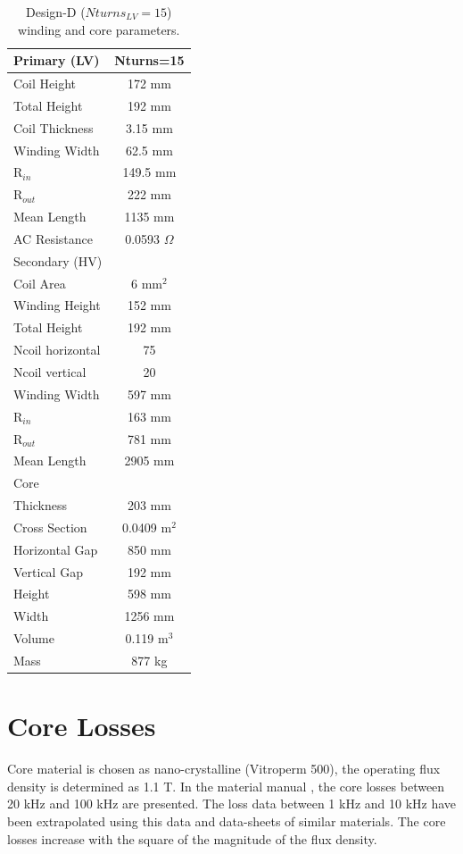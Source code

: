 \documentclass[a4paper, 11pt]{article} %
\begin{document}
\begin{table}[]
\begin{center}
\begin{tabular}{lc}
Primary (LV) & Nturns=15\\
\hline
Coil Height & 172 mm \\
Total Height & 192 mm \\
Coil Thickness & 3.15 mm\\
Winding Width & 62.5 mm \\
R$_{in}$ & 149.5 mm \\
R$_{out}$ & 222 mm \\
Mean Length & 1135 mm \\
AC Resistance & 0.0593 $\Omega$ \\
\hline
Secondary (HV) \\
Coil Area & 6 mm$^2$\\
Winding Height & 152 mm \\ 
Total Height & 192 mm \\
Ncoil horizontal & 75 \\
Ncoil vertical & 20 \\
Winding Width & 597 mm \\
R$_{in}$ & 163 mm \\
R$_{out}$ & 781 mm \\
Mean Length & 2905 mm \\
\hline
Core \\
Thickness & 203 mm \\
Cross Section & 0.0409 m$^2$\\
Horizontal Gap & 850 mm \\
Vertical Gap & 192 mm \\
Height & 598 mm \\
Width & 1256 mm \\
Volume & 0.119 m$^3$ \\
Mass & 877 kg \\
\hline
\end{tabular} 
\end{center}
\caption{Design-D ($Nturns_{LV}=15$) winding and core parameters.}
\label{design_D}
\end{table}

\clearpage

\section{Core Losses}
Core material is chosen as nano-crystalline (Vitroperm 500), the operating flux density is determined as 1.1 T.  In the material manual \cite{Vacuumschmelze2003}, the core losses between 20 kHz and 100 kHz are presented. The loss data between 1 kHz  and 10 kHz have been extrapolated using this data and data-sheets of similar materials.  The core losses increase with the square of the magnitude of the flux density. 
\end{document}
